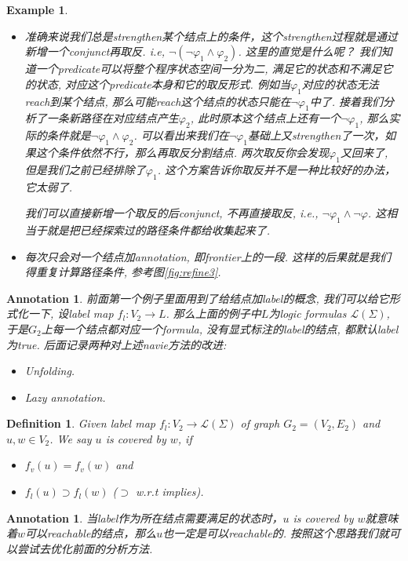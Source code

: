 \documentclass{article}
\newtheorem{example}[theorem]{Example}
\newtheorem{definition}[theorem]{Definition}
\newtheorem{annotation}[theorem]{Annotation}
\begin{document}
\begin{example}
\begin{itemize}
    \item 准确来说我们总是strengthen某个结点上的条件，这个strengthen过程就是通过新增一个conjunct再取反. i.e, $\neg (\neg \varphi_1 \wedge \varphi_2)$. 这里的直觉是什么呢？ 我们知道一个predicate可以将整个程序状态空间一分为二, 满足它的状态和不满足它的状态, 对应这个predicate本身和它的取反形式. 例如当$\varphi_1$对应的状态无法reach到某个结点, 那么可能reach这个结点的状态只能在$\neg \varphi_1$中了. 接着我们分析了一条新路径在对应结点产生$\varphi_2$, 此时原本这个结点上还有一个$\neg \varphi_1$, 那么实际的条件就是$\neg \varphi_1 \wedge \varphi_2$. 可以看出来我们在$\neg \varphi_1$基础上又strengthen了一次，如果这个条件依然不行，那么再取反分割结点. 两次取反你会发现$\varphi_1$又回来了, 但是我们之前已经排除了$\varphi_1$. 这个方案告诉你取反并不是一种比较好的办法，它太弱了.
      
    我们可以直接新增一个取反的后conjunct, 不再直接取反, i.e., $\neg \varphi_1 \wedge \neg \varphi$. 这相当于就是把已经探索过的路径条件都给收集起来了.
    \item 每次只会对一个结点加annotation, 即frontier上的一段. 这样的后果就是我们得重复计算路径条件, 参考图\ref{fig:refine3}.      
\end{itemize}    
\end{example}

\begin{annotation}
\rm 前面第一个例子里面用到了给结点加label的概念, 我们可以给它形式化一下, 设label map $f_l: V_2 \to L$. 那么上面的例子中$L$为logic formulas $\mathcal{L}(\Sigma)$, 于是$G_2$上每一个结点都对应一个formula, 没有显式标注的label的结点, 都默认label为true. 后面记录两种对上述navie方法的改进:
\begin{itemize}
	\item Unfolding.
	\item Lazy annotation.
\end{itemize}
\end{annotation}

\begin{definition}
\rm Given label map $f_l: V_2 \to \mathcal{L}(\Sigma)$ of graph $G_2=(V_2,E_2)$ and $u,w \in V_2$. We say $u$ is covered by $w$, if
\begin{itemize}
	\item $f_v(u) = f_v(w)$ and 
	\item $f_l(u) \supset f_l(w)$ ($\supset$ w.r.t implies).
\end{itemize}
\end{definition}

\begin{annotation}
\rm 当label作为所在结点需要满足的状态时，$u$ is covered by $w$就意味着$w$可以reachable的结点，那么$u$也一定是可以reachable的. 按照这个思路我们就可以尝试去优化前面的分析方法. 
\end{annotation}
\end{document}
